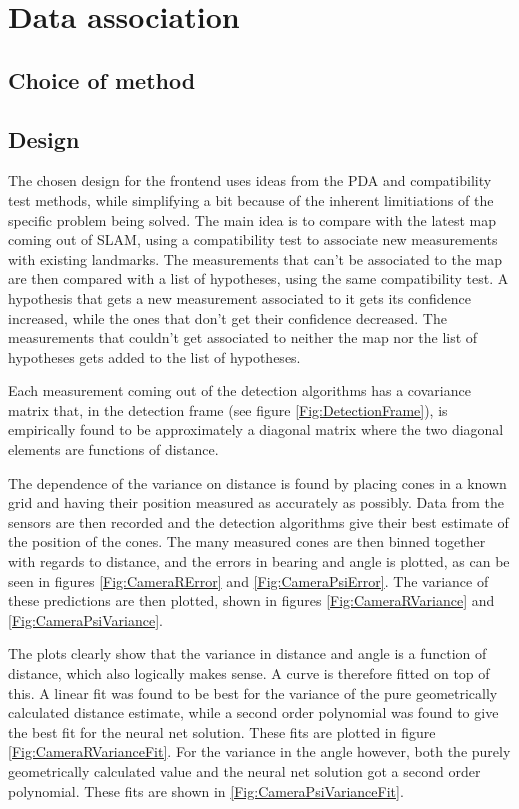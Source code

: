 \section{Data association}
\subsection{Choice of method}

\subsection{Design}
The chosen design for the frontend uses ideas from the PDA and compatibility test methods, while simplifying a bit because of the inherent limitiations of the specific problem being solved. The main idea is to compare with the latest map coming out of SLAM, using a compatibility test to associate new measurements with existing landmarks. The measurements that can't be associated to the map are then compared with a list of hypotheses, using the same compatibility test. A hypothesis that gets a new measurement associated to it gets its confidence increased, while the ones that don't get their confidence decreased. The measurements that couldn't get associated to neither the map nor the list of hypotheses gets added to the list of hypotheses. 

Each measurement coming out of the detection algorithms has a covariance matrix that, in the detection frame (see figure \ref{Fig:DetectionFrame}), is empirically found to be approximately a diagonal matrix where the two diagonal elements are functions of distance. 


The dependence of the variance on distance is found by placing cones in a known grid and having their position measured as accurately as possibly. Data from the sensors are then recorded and the detection algorithms give their best estimate of the position of the cones. The many measured cones are then binned together with regards to distance, and the errors in bearing and angle is plotted, as can be seen in figures \ref{Fig:CameraRError} and \ref{Fig:CameraPsiError}. The variance of these predictions are then plotted, shown in figures \ref{Fig:CameraRVariance} and \ref{Fig:CameraPsiVariance}. 

The plots clearly show that the variance in distance and angle is a function of distance, which also logically makes sense. A curve is therefore fitted on top of this. A linear fit was found to be best for the variance of the pure geometrically calculated distance estimate, while a second order polynomial was found to give the best fit for the neural net solution. These fits are plotted in figure \ref{Fig:CameraRVarianceFit}. For the variance in the angle however, both the purely geometrically calculated value and the neural net solution got a second order polynomial. These fits are shown in \ref{Fig:CameraPsiVarianceFit}.


